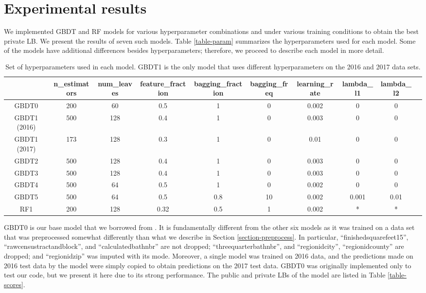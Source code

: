 \documentclass[12pt]{article}
\begin{document}
\section{Experimental results}

We implemented GBDT and RF models for various hyperparameter combinations and under various training conditions to obtain the best private LB. We present the results of seven such models. Table \ref{table-param} summarizes the hyperparameters used for each model. Some of the models have additional differences besides hyperparameters; therefore, we proceed to describe each model in more detail.

\begin{table}
\centering
\caption{\label{table-params} Set of hyperparameters used in each model. GBDT1 is the only model that uses different hyperparameters on the 2016 and 2017 data sets.}
\begin{tabular}{|c|c|c|c|c|c|c|c|c|c|} \hline
\quad & n\_estimators & num\_leaves & feature\_fraction & bagging\_fraction & bagging\_freq & learning\_rate & lambda\_l1 & lambda\_l2 \\ \hline
GBDT0 & 200 & 60 & 0.5 & 1 & 0 & 0.002 & 0 & 0 \\
GBDT1 (2016) & 500 & 128 & 0.4 & 1 & 0 & 0.003 & 0 & 0 \\
GBDT1 (2017) & 173 & 128 & 0.3 & 1 & 0 & 0.01 & 0 & 0 \\
GBDT2 & 500 & 128 & 0.4 & 1 & 0 & 0.003 & 0 & 0 \\
GBDT3 & 500 & 128 & 0.4 & 1 & 0 & 0.003 & 0 & 0 \\
GBDT4 & 500 & 64 & 0.5 & 1 & 0 & 0.002 & 0 & 0 \\
GBDT5 & 500 & 64 & 0.5 & 0.8 & 10 & 0.002 & 0.001 & 0.01 \\
RF1 & 200 & 128 & 0.32 & 0.5 & 1 & 0.002 & * & * \\
\hline
\end{tabular}
\end{table}

GBDT0 is our base model that we borrowed from \cite{rtlatimer}. It is fundamentally different from the other six models as it was trained on a data set that was preprocessed somewhat differently than what we describe in Section \ref{section-preprocess}. In particular, ``finishedsquarefeet15'', ``rawcensustractandblock'', and ``calculatedbathnbr'' are not dropped; ``threequarterbathnbr'', and ``regionidcity'', ``regionidcounty'' are dropped; and ``regionidzip'' was imputed with its mode. Moreover, a single model was trained on 2016 data, and the predictions made on 2016 test data by the model were simply copied to obtain predictions on the 2017 test data. GBDT0 was originally implemented only to test our code, but we present it here due to its strong performance. The public and private LBs of the model are listed in Table \ref{table-scores}.
\end{document}
